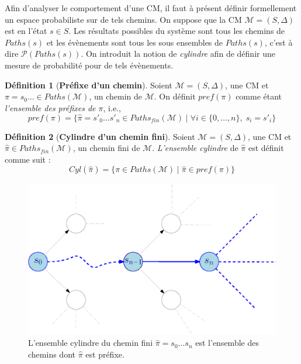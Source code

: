 \documentclass[12pt,a4paper]{report}
\theoremstyle{definition}%
\newtheorem{definition}{Définition}[chapter]
\theoremstyle{remark}
\newcommand{\ie}{i.e., }
\begin{document}
Afin d'analyser le comportement d'une CM, il faut à présent définir formellement un espace probabiliste sur de tels chemins. On suppose que la CM $\mathcal{M} = (S, \Delta)$ est en l'état $s \in S$. Les résultats possibles du système sont tous les chemins de $Paths(s)$ et les évènements sont tous les sous ensembles de $Paths(s)$, c'est à dire $\mathcal{P}(Paths(s))$. On introduit la notion de \textit{cylindre} afin de définir une mesure de probabilité pour de tels évènements.

\begin{definition}[\textbf{Préfixe d'un chemin}]
	Soient $\mathcal{M} = (S, \Delta)$, une CM et $\pi = s_0 \dots \in Paths(\mathcal{M})$, un chemin de $\mathcal{M}$. On définit $pref(\pi)$ comme étant \textit{l'ensemble des préfixes de $\pi$}, \ie
	\[ pref(\pi) = \{ \hat{\pi} = s'_0 \dots s'_n \in Paths_{fin}(\mathcal{M}) \; | \; \forall i \in \{0, \dots, n \}, \; s_i = s'_i \} \]
\end{definition}

\begin{definition}[\textbf{Cylindre d'un chemin fini}]
	Soient $\mathcal{M} = (S, \Delta)$, une CM et $\hat{\pi} \in Paths_{fin}(\mathcal{M})$, un chemin fini de $\mathcal{M}$.  \textit{L'ensemble cylindre} de $\hat{\pi}$ est définit comme suit :
	\[ Cyl(\hat{\pi}) = \{\pi \in Paths(\mathcal{M}) \; | \; \hat{\pi} \in pref(\pi) \}\]
\end{definition}

\begin{figure}[h]
	\centering
	\captionsetup{justification=centering}
	\includegraphics[scale=0.7]{figures/cylinder-set.eps}
	\caption{L'ensemble cylindre du chemin fini $\hat{\pi} = s_0 \dots s_n$ est {\color{blue}l'ensemble des chemins} dont $\hat{\pi}$ est préfixe.}
\end{figure}
\end{document}
